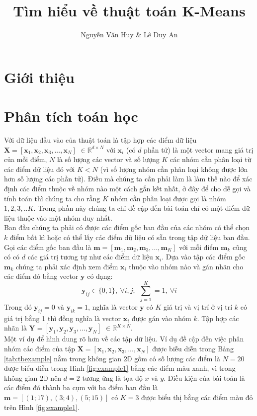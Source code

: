\documentclass{article}
\title{Tìm hiểu về thuật toán K-Means}
\author{Nguyễn Văn Huy \& Lê Duy An}
\begin{document}
\maketitle{} 
\newpage
\tableofcontents
\newpage

\section{Giới thiệu} %
\label{sec:giới_thiệu}

\section{Phân tích toán học} %
\label{sec:phân_tích_toán_học}
Với dữ liệu đầu vào của thuật toán là tập hợp các điểm dữ liệu $\mathbf{X} = [\mathbf{x}_1,\mathbf{x}_2,\mathbf{x}_3,...,\mathbf{x}_N]$ $\in \mathds{R}^{d\times N}$ với $\mathbf{x}_i$ (có $d$ phần tử) là một vector mang giá trị của mỗi điểm, $N$ là số lượng các vector và số lượng $K$ các nhóm cần phân loại từ các điểm dữ liệu đó với $K < N$ (vì số lượng nhóm cần phân loại không được lớn hơn số lượng các phần tử). Điều mà chúng ta cần phải làm là làm thế nào để xác định các điểm thuộc về nhóm nào một cách gắn kết nhất, ở đây để cho dễ gọi và tính toán thì chúng ta cho rằng $K$ nhóm cần phần loại được gọi là nhóm $1,2,3,..K$. Trong phần này chúng ta chỉ đề cập đến bài toán chỉ có một điểm dữ liệu thuộc vào một nhóm duy nhất.
\\
Ban đầu chúng ta phải có được các điểm gốc ban đầu của các nhóm có thể chọn $k$ điểm bất kì hoặc có thể lấy các điểm dữ liệu có sẵn trong tập dữ liệu ban đầu. Gọi các điểm gốc ban đầu là $\mathbf{m} = [\mathbf{m}_1,\mathbf{m}_2,\mathbf{m}_3,...,\mathbf{m}_K]$ với mỗi điểm $\mathbf{m}_k$ cũng có có $d$ các giá trị tương tự như các điểm dữ liệu $\mathbf{x}_i$. Dựa vào tập các điểm gốc $\mathbf{m}_k$ chúng ta phải xác định xem điểm $\mathbf{x}_i$ thuộc vào nhóm nào và gán nhãn cho các điểm đó bằng vector $\mathbf{y}$ có dạng:
$$\mathbf{y}_{ij} \in \{0,1\},\ \forall i,j;\ \  \sum_{j = 1}^{K} = 1,\  \forall i$$
Trong đó $\mathbf{y}_{ij} = 0$ và $\mathbf{y}_{ik} = 1$, nghĩa là vector $\mathbf{y}$ có $K$ giá trị và vị trí ở vị trí $k$ có giá trị bằng 1 thì đồng nghĩa là vector $\mathbf{x}_i$ được gán vào nhóm $k$. Tập hợp các nhãn là $\mathbf{Y} = [\mathbf{y}_1,\mathbf{y}_2,\mathbf{y}_3,...,\mathbf{y}_N]$ $\in \mathds{R}^{K\times N}$.
\\ 
Một ví dụ để hình dung rõ hơn về các tập dữ liệu. Ví dụ đề cập đến việc phân nhóm các điểm của tập $\mathbf{X} = [\mathbf{x}_1,\mathbf{x}_2,\mathbf{x}_3,...,\mathbf{x}_N]$ được biễu diễn trong Bảng \ref{tab:tbexample} nằm trong  không gian $2\mathds{D}$ gồm có số lượng các điểm là $N = 20$ được biểu diễn trong Hình \ref{fig:example1} bằng các điểm màu xanh, vì trong không gian $2\mathds{D}$ nên $d = 2$ tương ứng là tọa độ $x$ và $y$. Điều kiện của bài toán là các điểm đó thành ba cụm với ba điểm ban đầu là $\mathbf{m} = [(1;17),(3;4),(5;15)]$ có $K = 3$ được biểu thị bằng các điểm màu đỏ trên Hình \ref{fig:example1}.
\end{document}

